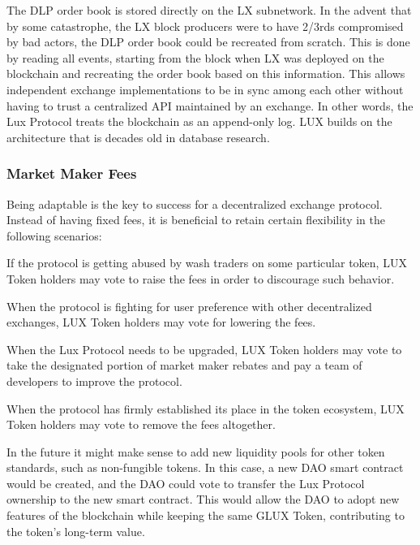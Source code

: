 \documentclass[11pt]{article}
\begin{document}
The DLP order book is stored directly on the LX subnetwork. In the advent that by some catastrophe, the LX block producers were to have 2/3rds compromised by bad actors, the DLP order book could be recreated from scratch. This is done by reading all events, starting from the block when LX was deployed on the blockchain and recreating the order book based on this information. This allows independent exchange implementations to be in sync among each other without having to trust a centralized API maintained by an exchange. In other words, the Lux Protocol treats the blockchain as an append-only log. LUX builds on the architecture that is decades old in database research.


\subsubsection{Market Maker Fees}

Being adaptable is the key to success for a decentralized exchange protocol. Instead of having fixed fees, it is beneficial to retain certain flexibility in the following scenarios:


If the protocol is getting abused by wash traders on some particular token, LUX Token holders may vote to raise the fees in order to discourage such behavior.


When the protocol is fighting for user preference with other decentralized exchanges, LUX Token holders may vote for lowering the fees.


When the Lux Protocol needs to be upgraded, LUX Token holders may vote to take the designated portion of market maker rebates and pay a team of developers to improve the protocol.


When the protocol has firmly established its place in the token ecosystem, LUX Token holders may vote to remove the fees altogether.


In the future it might make sense to add new liquidity pools for other token standards, such as non-fungible tokens. In this case, a new DAO smart contract would be created, and the DAO could vote to transfer the Lux Protocol ownership to the new smart contract. This would allow the DAO to adopt new features of the blockchain while keeping the same GLUX Token, contributing to the token's long-term value.
\end{document}
